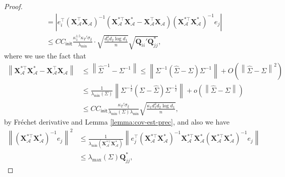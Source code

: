 \documentclass[12pt]{article}
\newcommand{\abs}[1]{\left\lvert#1\right\rvert}
\newcommand{\norm}[1]{\left\lVert#1\right\rVert}
\newcommand{\init}{{\mathsf{init}}}
\theoremstyle{plain}
\begin{document}
\begin{proof}
\begin{equation}
\begin{aligned}
    &= \abs{e_i^\top  \left(\mathbf{X}_{\mathcal{A}}^{\top} \mathbf{X}_{\mathcal{A}}\right)^{-1}\left( \mathbf{X}_{\mathcal{A}}^{*\top} \mathbf{X}_{\mathcal{A}}^* - \mathbf{X}_{\mathcal{A}}^{\top} \mathbf{X}_{\mathcal{A}}\right)\left(\mathbf{X}_{\mathcal{A}}^{*\top} \mathbf{X}_{\mathcal{A}}^*\right)^{-1}e_j} \\
    & \le CC_{\init}\frac{\kappa_1^{1.5} \kappa_T' \sigma_{\xi} }{ \lambda_{\min}  }\cdot \sqrt{\frac{ d_1^2 d_2 \log d_1}{n}}\sqrt{\mathbf{Q}_{ii}'\mathbf{Q}_{jj}^* },
   \end{aligned}
\end{equation}
where we use the fact that 
\begin{equation*}
\begin{aligned}
      \norm{\mathbf{X}_{\mathcal{A}}^{*\top} \mathbf{X}_{\mathcal{A}}^* - \mathbf{X}_{\mathcal{A}}^{\top} \mathbf{X}_{\mathcal{A}}}&\le \norm{\widehat{\Sigma}^{-1}-\Sigma^{-1} }\le \norm{\Sigma^{-1}(\widehat{\Sigma}-\Sigma)\Sigma^{-1}  } + O\left(\norm{\widehat{\Sigma}-\Sigma }^2 \right) \\
      & \le \frac{1}{\lambda_{\min}(\Sigma) } \norm{\Sigma^{-\frac{1}{2} }(\Sigma-\widehat{\Sigma})\Sigma^{-\frac{1}{2} }} + o\left(\norm{\widehat{\Sigma}-\Sigma } \right) \\
      & \le CC_{\init}\frac{\kappa_T' \sigma_\xi }{\lambda_{\min}(\Sigma)\lambda_{\min} }\sqrt{\frac{ \kappa_1  d_1^2 d_2 \log d_1 }{n}},
\end{aligned}
\end{equation*}
by Fréchet derivative \citep{higham2008functions,al2009computing} and Lemma \ref{lemma:cov-est-prec}, and also we have
\begin{equation*}
\begin{aligned}
      \norm{\left(\mathbf{X}_{\mathcal{A}}^{*\top} \mathbf{X}_{\mathcal{A}}^*\right)^{-1}e_j}^2 & \le \frac{1}{\lambda_{\min}\left(\mathbf{X}_{\mathcal{A}}^{*\top} \mathbf{X}_{\mathcal{A}}^*\right)  } \norm{ e^\top_j \left(\mathbf{X}_{\mathcal{A}}^{*\top} \mathbf{X}_{\mathcal{A}}^*\right)^{-1}\mathbf{X}_{\mathcal{A}}^{*\top} \mathbf{X}_{\mathcal{A}}^*\left(\mathbf{X}_{\mathcal{A}}^{*\top} \mathbf{X}_{\mathcal{A}}^*\right)^{-1}e_j } \\
      & \le \lambda_{\max}(\Sigma) \mathbf{Q}_{jj}^*,
\end{aligned}
\end{equation*}


\end{proof}
\end{document}
